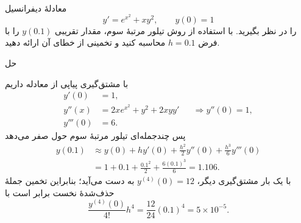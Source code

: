 \\
معادلهٔ دیفرانسیل
\[
 y'=e^{x^2}+xy^2,
 \qquad y(0)=1
\]
را در نظر بگیرید. با استفاده از روش تیلور مرتبهٔ سوم، مقدار تقریبی
\(y(0.1)\)
را با فرض
\(h=0.1\)
محاسبه کنید و تخمینی از خطای آن ارائه دهید.

\begingroup\color{blue}
حل

با مشتق‌گیری پیاپی از معادله داریم
\begin{align*}
 y'(0)&=1,\\
 y''(x)&=2xe^{x^2}+y^2+2xyy'
       &&\Longrightarrow y''(0)=1,\\
 y'''(0)&=6.
\end{align*}
پس چندجمله‌ای تیلور مرتبهٔ سوم حول صفر می‌دهد
\begin{align*}
 y(0.1)&\approx y(0)+hy'(0)+\frac{h^2}{2}y''(0)
                 +\frac{h^3}{6}y'''(0)\\
 &=1+0.1+\frac{0.1^2}{2}+\frac{6(0.1)^3}{6}
 =1.106.
\end{align*}
با یک بار مشتق‌گیری دیگر،
\(y^{(4)}(0)=12\)
به دست می‌آید؛ بنابراین تخمین جملهٔ حذف‌شدهٔ نخست برابر است با
\[
 \frac{y^{(4)}(0)}{4!}h^4
 =\frac{12}{24}(0.1)^4=5\times10^{-5}.
\]
\endgroup
